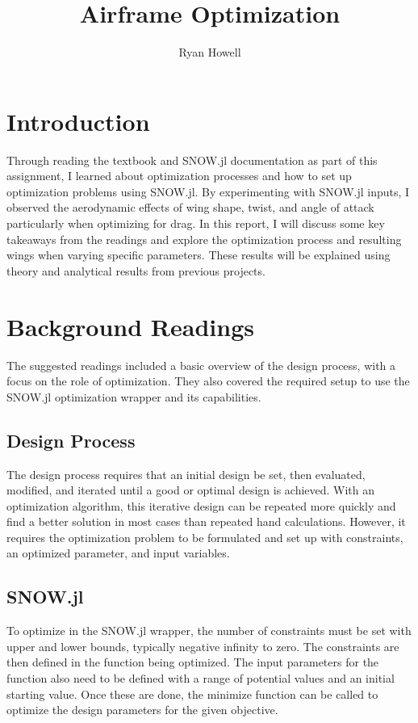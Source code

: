 \documentclass{article}
\title{Airframe Optimization}
\author{Ryan Howell}
\begin{document}
\maketitle



\section{Introduction}

Through reading the textbook and SNOW.jl documentation as part of this assignment, I learned about optimization processes and how to set up optimization problems using SNOW.jl. By experimenting with SNOW.jl inputs, I observed the aerodynamic effects of wing shape, twist, and angle of attack particularly when optimizing for drag. In this report, I will discuss some key takeaways from the readings and explore the optimization process and resulting wings when varying specific parameters. These results will be explained using theory and analytical results from previous projects.

\section{Background Readings}
The suggested readings included a basic overview of the design process, with a focus on the role of optimization. They also covered the required setup to use the SNOW.jl optimization wrapper and its capabilities.

\subsection{Design Process}
The design process requires that an initial design be set, then evaluated, modified, and iterated until a good or optimal design is achieved. With an optimization algorithm, this iterative design can be repeated more quickly and find a better solution in most cases than repeated hand calculations. However, it requires the optimization problem to be formulated and set up with constraints, an optimized parameter, and input variables. 

\subsection{SNOW.jl}
To optimize in the SNOW.jl wrapper, the number of constraints must be set with upper and lower bounds, typically negative infinity to zero. The constraints are then defined in the function being optimized. The input parameters for the function also need to be defined with a range of potential values and an initial starting value. Once these are done, the minimize function can be called to optimize the design parameters for the given objective.
\end{document}
